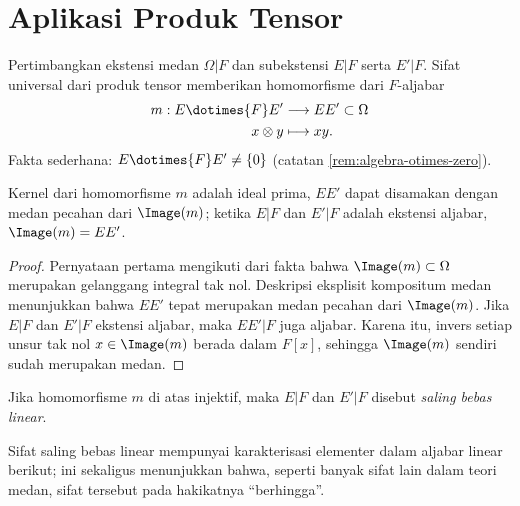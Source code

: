 \section{Aplikasi Produk Tensor}\label{sec:tensor-field}
Pertimbangkan ekstensi medan $\Omega|F$ dan subekstensi $E|F$ serta $E'|F$. Sifat universal dari produk tensor memberikan homomorfisme dari $F$-aljabar
\begin{align*}
	m: E \dotimes{F} E' & \longrightarrow EE' \subset \Omega \\
	x \otimes y & \longmapsto xy.
\end{align*}
Fakta sederhana: $E \dotimes{F} E' \neq \{0\}$ (catatan \ref{rem:algebra-otimes-zero}).

\begin{lemma}
	Kernel dari homomorfisme $m$ adalah ideal prima, $EE'$ dapat disamakan dengan medan pecahan dari $\Image(m)$; ketika $E|F$ dan $E'|F$ adalah ekstensi aljabar, $\Image(m)=EE'$.
\end{lemma}
\begin{proof}
	Pernyataan pertama mengikuti dari fakta bahwa $\Image(m) \subset \Omega$ merupakan gelanggang integral tak nol. Deskripsi eksplisit kompositum medan menunjukkan bahwa $EE'$ tepat merupakan medan pecahan dari $\Image(m)$. Jika $E|F$ dan $E'|F$ ekstensi aljabar, maka $EE'|F$ juga aljabar. Karena itu, invers setiap unsur tak nol $x \in \Image(m)$ berada dalam $F[x]$, sehingga $\Image(m)$ sendiri sudah merupakan medan.
\end{proof}

\begin{definition}
	Jika homomorfisme $m$ di atas injektif, maka $E|F$ dan $E'|F$ disebut \emph{saling bebas linear}.
\end{definition}
Sifat saling bebas linear mempunyai karakterisasi elementer dalam aljabar linear berikut; ini sekaligus menunjukkan bahwa, seperti banyak sifat lain dalam teori medan, sifat tersebut pada hakikatnya ``berhingga''.

